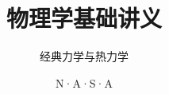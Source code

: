 \documentclass[themecolor=colorful,openany]{textbook-cn}%
\title{物理学基础讲义}
\subtitle{经典力学与热力学}
\author{N·A·S·A}
\begin{document}
\MainFont

\makecover
\maketitle

\frontmatter




\shorttableofcontents
\tableofcontents

%
\mainmatter

%	
%	
%	
%	
%		
%		
%
\end{document}
